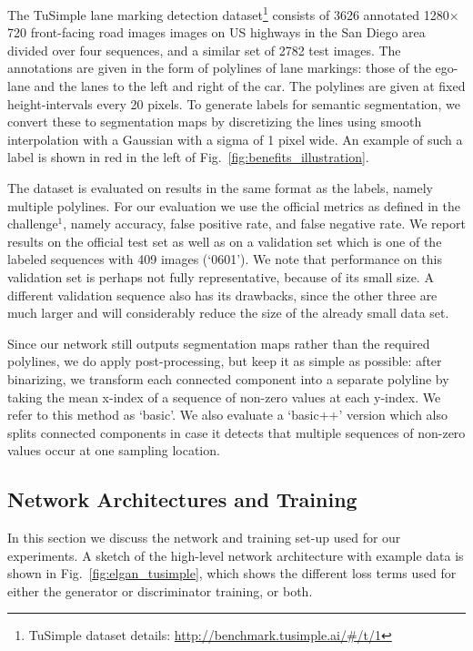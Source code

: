 \documentclass{article} \usepackage{nips13submit_e,times}
\begin{document}
The TuSimple lane marking detection dataset\footnote{TuSimple dataset details: \url{http://benchmark.tusimple.ai/\#/t/1}} consists of 3626 annotated 1280$\times$720 front-facing road images images on US highways in the San Diego area divided over four sequences, and a similar set of 2782 test images.
The annotations are given in the form of polylines of lane markings: those of the ego-lane and the lanes to the left and right of the car.
The polylines are given at fixed height-intervals every 20 pixels.
To generate labels for semantic segmentation, we convert these to segmentation maps by discretizing the lines using smooth interpolation with a Gaussian with a sigma of 1 pixel wide.
An example of such a label is shown in red in the left of Fig.~\ref{fig:benefits_illustration}.

The dataset is evaluated on results in the same format as the labels, namely multiple polylines.
For our evaluation we use the official metrics as defined in the challenge$^1$, namely accuracy, false positive rate, and false negative rate.
We report results on the official test set as well as on a validation set which is one of the labeled sequences with 409 images (`0601').
We note that performance on this validation set is perhaps not fully representative, because of its small size.
A different validation sequence also has its drawbacks, since the other three are much larger and will considerably reduce the size of the already small data set.


Since our network still outputs segmentation maps rather than the required polylines, we do apply post-processing, but keep it as simple as possible: after binarizing, we transform each connected component into a separate polyline by taking the mean x-index of a sequence of non-zero values at each y-index.
We refer to this method as `basic'.
We also evaluate a `basic++' version which also splits connected components in case it detects that multiple sequences of non-zero values occur at one sampling location.










\subsection{Network Architectures and Training}

In this section we discuss the network and training set-up used for our experiments.
A sketch of the high-level network architecture with example data is shown in Fig.~\ref{fig:elgan_tusimple}, which shows the different loss terms used for either the generator or discriminator training, or both.
\end{document}
